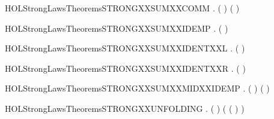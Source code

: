 \newcommand{\HOLStrongLawsTheoremsSTRONGXXSUMXXASSOCXXR}{\UseVerbatim{HOLStrongLawsTheoremsSTRONGXXSUMXXASSOCXXR}}
\begin{SaveVerbatim}{HOLStrongLawsTheoremsSTRONGXXSUMXXCOMM}
\HOLTokenTurnstile{} \HOLSymConst{\HOLTokenForall{}} .  ( \HOLSymConst{\ensuremath{+}} ) ( \HOLSymConst{\ensuremath{+}} )
\end{SaveVerbatim}
\newcommand{\HOLStrongLawsTheoremsSTRONGXXSUMXXCOMM}{\UseVerbatim{HOLStrongLawsTheoremsSTRONGXXSUMXXCOMM}}
\begin{SaveVerbatim}{HOLStrongLawsTheoremsSTRONGXXSUMXXIDEMP}
\HOLTokenTurnstile{} \HOLSymConst{\HOLTokenForall{}}.  ( \HOLSymConst{\ensuremath{+}} ) 
\end{SaveVerbatim}
\newcommand{\HOLStrongLawsTheoremsSTRONGXXSUMXXIDEMP}{\UseVerbatim{HOLStrongLawsTheoremsSTRONGXXSUMXXIDEMP}}
\begin{SaveVerbatim}{HOLStrongLawsTheoremsSTRONGXXSUMXXIDENTXXL}
\HOLTokenTurnstile{} \HOLSymConst{\HOLTokenForall{}}.  ( \HOLSymConst{\ensuremath{+}} ) 
\end{SaveVerbatim}
\newcommand{\HOLStrongLawsTheoremsSTRONGXXSUMXXIDENTXXL}{\UseVerbatim{HOLStrongLawsTheoremsSTRONGXXSUMXXIDENTXXL}}
\begin{SaveVerbatim}{HOLStrongLawsTheoremsSTRONGXXSUMXXIDENTXXR}
\HOLTokenTurnstile{} \HOLSymConst{\HOLTokenForall{}}.  ( \HOLSymConst{\ensuremath{+}} ) 
\end{SaveVerbatim}
\newcommand{\HOLStrongLawsTheoremsSTRONGXXSUMXXIDENTXXR}{\UseVerbatim{HOLStrongLawsTheoremsSTRONGXXSUMXXIDENTXXR}}
\begin{SaveVerbatim}{HOLStrongLawsTheoremsSTRONGXXSUMXXMIDXXIDEMP}
\HOLTokenTurnstile{} \HOLSymConst{\HOLTokenForall{}} .  ( \HOLSymConst{\ensuremath{+}}  \HOLSymConst{\ensuremath{+}} ) ( \HOLSymConst{\ensuremath{+}} )
\end{SaveVerbatim}
\newcommand{\HOLStrongLawsTheoremsSTRONGXXSUMXXMIDXXIDEMP}{\UseVerbatim{HOLStrongLawsTheoremsSTRONGXXSUMXXMIDXXIDEMP}}
\begin{SaveVerbatim}{HOLStrongLawsTheoremsSTRONGXXUNFOLDING}
\HOLTokenTurnstile{} \HOLSymConst{\HOLTokenForall{}} .  (\HOLConst{\ensuremath{\mu}}  ) (  (\HOLConst{\ensuremath{\mu}}  ) )
\end{SaveVerbatim}

